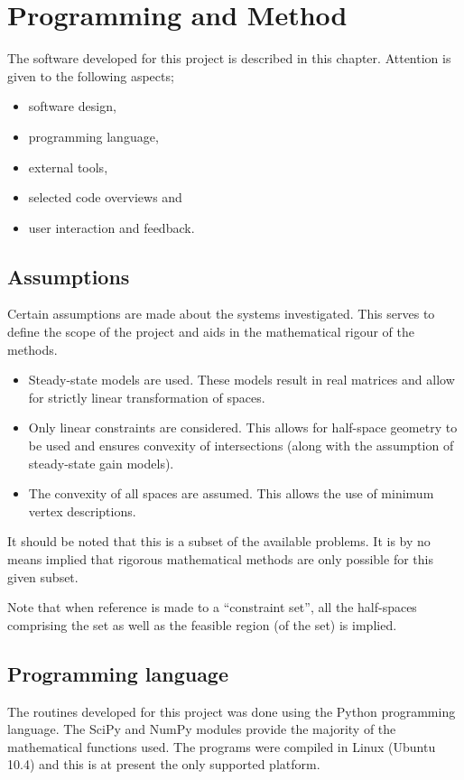 \chapter{Programming and Method}\label{chap:prog}
\begin{overview}
  The software developed for this project is described in this chapter.
  Attention is given to the following aspects;
  \begin{itemize}
    \item software design,
    \item programming language,
    \item external tools,
    \item selected code overviews and
    \item user interaction and feedback.
  \end{itemize}
\end{overview}

\section{Assumptions}
Certain assumptions are made about the systems investigated.
This serves to define the scope of the project and aids in the mathematical rigour of the methods.
\begin{itemize}
\item Steady-state models are used.
  These models result in real matrices and allow for strictly linear transformation of spaces.
\item Only linear constraints are considered.
  This allows for half-space geometry to be used and ensures convexity of intersections (along with the assumption of steady-state gain models).
\item The convexity of all spaces are assumed.
  This allows the use of minimum vertex descriptions.
\end{itemize}
It should be noted that this is a subset of the available problems.
It is by no means implied that rigorous mathematical methods are only possible for this given subset.

Note that when reference is made to a ``constraint set'', all the half-spaces comprising the set as well as the feasible region (of the set) is implied.

\section{Programming language}
The routines developed for this project was done using the Python programming language.
The SciPy and NumPy modules provide the majority of the mathematical functions used.
The programs were compiled in Linux (Ubuntu 10.4) and this is at present the only supported platform.

